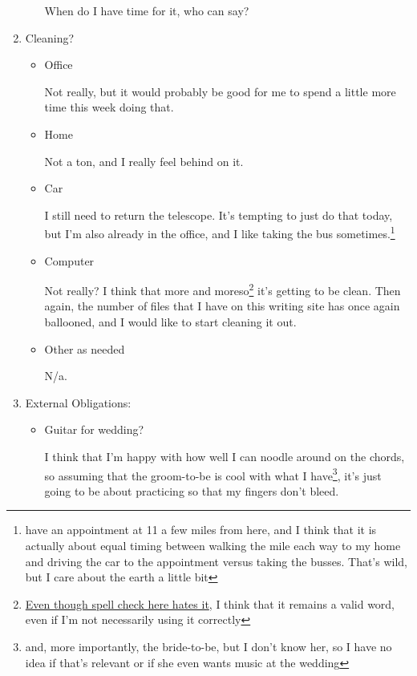 \documentclass[12pt]{article}
\renewcommand{\,}{\textsuperscript{,}}
\begin{document}
\begin{enumerate}
\begin{itemize}
When do I have time for it, who can say?

\end{itemize}

\item Cleaning?

\begin{itemize}

\item Office

Not really, but it would probably be good for me to spend a little more time this week doing that.

\item Home

Not a ton, and I really feel behind on it.

\item Car

I still need to return the telescope. It's tempting to just do that today, but I'm also already in the office, and I like taking the bus sometimes.\footnote{have an appointment at 11 a few miles from here, and I think that it is actually about equal timing between walking the mile each way to my home and driving the car to the appointment versus taking the busses. That's wild, but I care about the earth a little bit}

\item Computer

Not really? I think that more and moreso\footnote{\href{https://english.stackexchange.com/questions/211458/more-so-or-moreso}{Even though spell check here hates it}, I think that it remains a valid word, even if I'm not necessarily using it correctly} it's getting to be clean.  
Then again, the number of files that I have on this writing site has once again ballooned, and I would like to start cleaning it out.

\item Other as needed

N/a.

\end{itemize}

\item External Obligations:

\begin{itemize}

\item Guitar for wedding?

I think that I'm happy with how well I can noodle around on the chords, so assuming that the groom-to-be is cool with what I have\footnote{and, more importantly, the bride-to-be, but I don't know her, so I have no idea if that's relevant or if she even wants music at the wedding}, it's just going to be about practicing so that my fingers don't bleed.


\end{itemize}
\end{enumerate}
\end{document}

